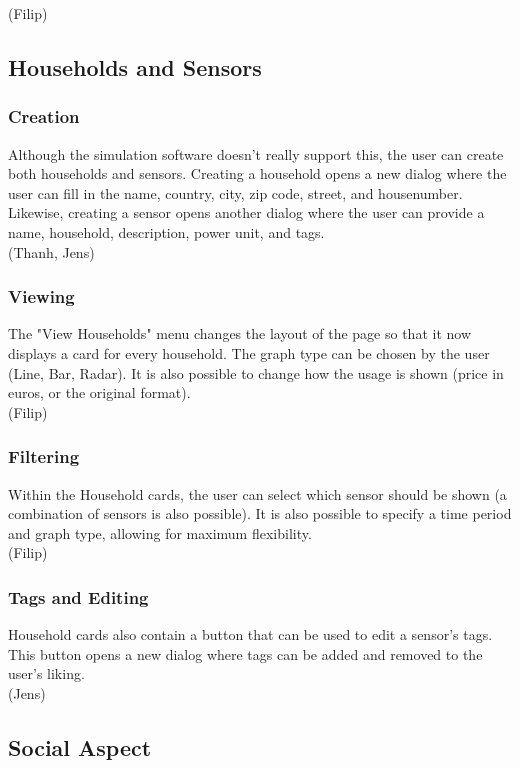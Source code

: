 \documentclass[11pt]{article}
\begin{document}
		(Filip)

  \subsection{Households and Sensors}
	\subsubsection{Creation}
		Although the simulation software doesn't really support this, the user can create both households and sensors.
		Creating a household opens a new dialog where the user can fill in the name, country, city, zip code, street, and housenumber.
		Likewise, creating a sensor opens another dialog where the user can provide a name, household, description, power unit, and tags.\\

		(Thanh, Jens)

	\subsubsection{Viewing}
		The "View Households" menu changes the layout of the page so that it now displays a card for every household.
		The graph type can be chosen by the user (Line, Bar, Radar).
		It is also possible to change how the usage is shown (price in euros, or the original format).\\

		(Filip)

	\subsubsection{Filtering}
		Within the Household cards, the user can select which sensor should be shown (a combination of sensors is also possible).
		It is also possible to specify a time period and graph type, allowing for maximum flexibility.\\

		(Filip)

	\subsubsection{Tags and Editing}
		Household cards also contain a button that can be used to edit a sensor's tags.
		This button opens a new dialog where tags can be added and removed to the user's liking.\\

		(Jens)

  \subsection{Social Aspect}
\end{document}
